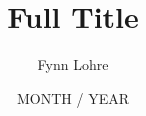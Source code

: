 \documentclass[
    11pt,                               %
    aspectratio=169,                    %
]{beamer}
\title[Short Title]{Full Title}                                     %
\author[Fynn Lohre]{Fynn Lohre}                                     %
\institute[ISS]{Institute of Statistical Statistics \\ (ISS)}       %
\date[Year]{MONTH / YEAR}                                           %
\begin{document}
\begin{frame}
\maketitle                                                           %
\end{frame}


\end{document}
